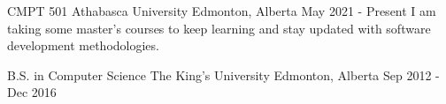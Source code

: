 
\begin{cventries}
  \cventry
    {CMPT 501} %
    {Athabasca University} %
    {Edmonton, Alberta} %
    {May 2021 - Present} %
    {I am taking some master's courses to keep learning and stay updated with software development methodologies.}

  \cventry
    {B.S. in Computer Science} %
    {The King's University} %
    {Edmonton, Alberta} %
    {Sep 2012 - Dec 2016} %
    {}
    
\end{cventries}